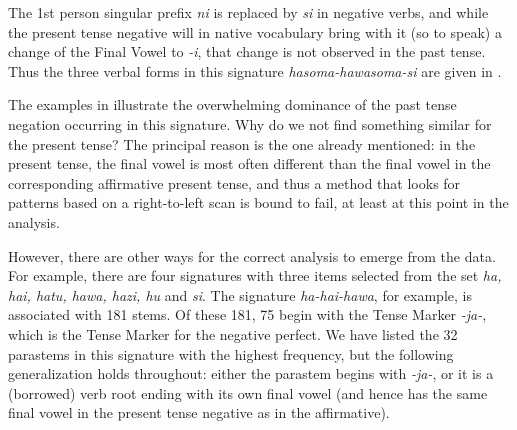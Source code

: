 \documentclass[output=paper,colorlinks,citecolor=brown]{langscibook}
\begin{document}
 The 1st person singular prefix \textit{ni} is replaced by \textit{si} in negative verbs, and while the present tense negative will in native vocabulary bring with it (so to speak) a change of the Final Vowel to \textit{-i}, that change is not observed in the past tense. Thus the three verbal forms in this signature \textit{hasoma-hawasoma-si} are given in .
 
The examples in  illustrate the overwhelming dominance of the past tense negation occurring in this signature. Why do we not find something similar for the present tense? The principal reason is the one already mentioned: in the present tense, the final vowel is most often different than the final vowel in the corresponding affirmative present tense, and thus a method that looks for patterns based on a right-to-left scan is bound to fail, at least at this point in the analysis.

However, there are other ways for the correct analysis to emerge from the data. For example, there are four signatures with three items selected from the set \textit{ha, hai, hatu, hawa, hazi, hu} and \textit{si}. The signature \textit{ha-hai-hawa}, for example, is associated with 181 stems. Of these 181, 75 begin with the Tense Marker \textit{-ja-}, which is the Tense Marker for the negative perfect. We have listed the 32 parastems in this signature with the highest frequency, but the following generalization holds throughout: either the parastem begins with \textit{-ja-}, or it is a (borrowed) verb root ending with its own final vowel (and hence has the same final vowel in the present tense negative as in the affirmative).
\end{document}
